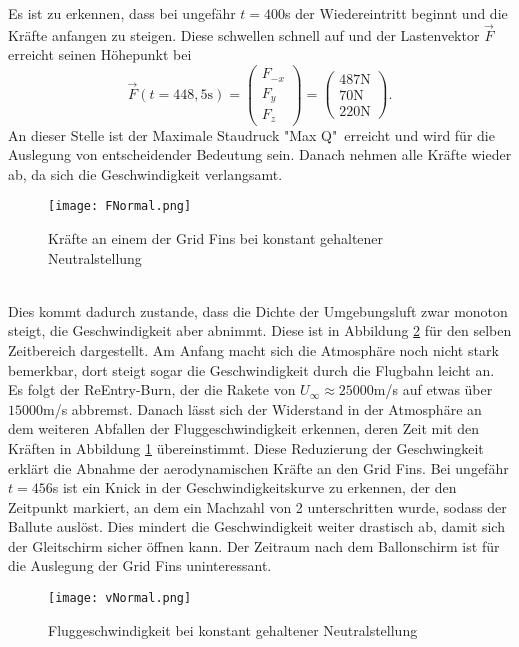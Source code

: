 Es ist zu erkennen, dass bei ungefähr $t=400$s der Wiedereintritt beginnt und die Kräfte anfangen zu steigen. Diese schwellen schnell auf und der Lastenvektor $\vec{F}$ erreicht seinen Höhepunkt bei
\begin{equation}
	\vec{F}(t=448,5\mathrm{s})=
		\left(\begin{array}{c}F_{-x}\\F_y\\F_z\end{array}\right)
			=\left(\begin{array}{c}487\mathrm{N}\\70\mathrm{N}\\220\mathrm{N}\end{array}\right).
\end{equation}
An dieser Stelle ist der Maximale Staudruck "Max Q"\ erreicht und wird für die Auslegung von entscheidender Bedeutung sein. Danach nehmen alle Kräfte wieder ab, da sich die Geschwindigkeit verlangsamt. 
\begin{figure}[h]
	\centering
	\texttt{[image: FNormal.png]}
	\caption{Kräfte an einem der Grid Fins bei konstant gehaltener Neutralstellung}
	\label{abb_KraefteNormal}
\end{figure}\\
Dies kommt dadurch zustande, dass die Dichte der Umgebungsluft zwar monoton steigt, die Geschwindigkeit aber abnimmt. Diese ist in Abbildung \ref{abb_vNormal} für den selben Zeitbereich dargestellt. Am Anfang macht sich die Atmosphäre noch nicht stark bemerkbar, dort steigt sogar die Geschwindigkeit durch die Flugbahn leicht an. Es folgt der ReEntry-Burn, der die Rakete von $U_\infty \approx 25000$m/s auf etwas über $15000$m/s abbremst. Danach lässt sich der Widerstand in der Atmosphäre an dem weiteren Abfallen der Fluggeschwindigkeit erkennen, deren Zeit mit den Kräften in Abbildung \ref{abb_KraefteNormal} übereinstimmt. Diese Reduzierung der Geschwingkeit erklärt die Abnahme der aerodynamischen Kräfte an den Grid Fins. Bei ungefähr $t=456$s ist ein Knick in der Geschwindigkeitskurve zu erkennen, der den Zeitpunkt markiert, an dem ein Machzahl von 2 unterschritten wurde, sodass der Ballute auslöst. Dies mindert die Geschwindigkeit weiter drastisch ab, damit sich der Gleitschirm sicher öffnen kann. Der Zeitraum nach dem Ballonschirm ist für die Auslegung der Grid Fins uninteressant.
\begin{figure}[h]
	\centering
	\texttt{[image: vNormal.png]}
	\caption{Fluggeschwindigkeit bei konstant gehaltener Neutralstellung}
	\label{abb_vNormal}
\end{figure}\\
